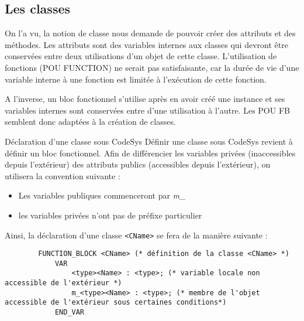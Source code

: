 \subsection{Les classes}
\label{subsec:classes}

On l'a vu, la notion de classe nous demande de pouvoir créer des attributs et des méthodes. Les attributs sont des variables internes aux classes qui devront être conservées entre deux utilisations d'un objet de cette classe.
L'utilisation de fonctions (POU FUNCTION) ne serait pas satisfaisante, car la durée de vie d'une variable interne à une fonction est limitée à l'exécution de cette fonction.

A l'inverse, un bloc fonctionnel s'utilise après en avoir créé une instance et ses variables internes sont conservées entre d'une utilisation à l'autre. Les POU FB semblent donc adaptées à la création de classes.


\begin{UPSTIinfor}{Déclaration d'une classe sous CodeSys}
    Définir une classe sous CodeSys revient à définir un bloc fonctionnel. Afin de différencier les variables privées (inaccessibles depuis l'extérieur) des attributs publics (accessibles depuis l'extérieur), on utilisera la convention suivante :
    \begin{itemize}
        \item Les variables publiques commenceront par \emph{m\_}
        \item les variables privées n'ont pas de préfixe particulier
    \end{itemize}

    Ainsi, la déclaration d'une classe \lstinline[language=ST]{<CName>} se fera de la manière suivante :
    \begin{lstlisting}
        FUNCTION_BLOCK <CName> (* définition de la classe <CName> *)
            VAR
                <type><Name> : <type>; (* variable locale non accessible de l'extérieur *)
                m_<type><Name> : <type>; (* membre de l'objet accessible de l'extérieur sous certaines conditions*)
            END_VAR
    \end{lstlisting}
\end{UPSTIinfor}

